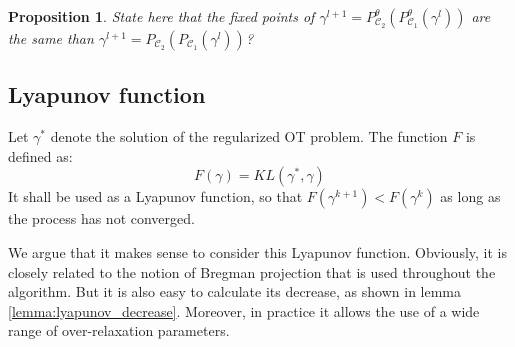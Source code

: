 \documentclass{article} %
\DeclareMathOperator{\Ccal}{\mathcal{C}}
\theoremstyle{plain}
\newtheorem{proposition}{Proposition}
\theoremstyle{definition}
\theoremstyle{remark}
\begin{document}
{\color{blue} \begin{proposition} 
State here that the fixed points of   $\gamma^{l+1} =P^\theta_{\Ccal_2}(P^\theta_{\Ccal_1}(\gamma^l))$ are the same than $\gamma^{l+1} =P_{\Ccal_2}(P_{\Ccal_1}(\gamma^l))$?
\end{proposition}}
\subsection{Lyapunov function}
Let $\gamma^*$ denote the solution of the regularized OT problem.
The function $F$ is defined as:
\begin{equation}\label{eq:lyapunov_function}
F(\gamma) = KL(\gamma^*, \gamma)
\end{equation}
It shall be used as a Lyapunov function, so that $F(\gamma^{k+1}) < F(\gamma^k)$ as long as the process has not converged.

We argue that it makes sense to consider this Lyapunov function.
Obviously, it is closely related to the notion of Bregman projection that is used throughout the algorithm.
But it is also easy to calculate its decrease, as shown in lemma \ref{lemma:lyapunov_decrease}.
Moreover, in practice it allows the use of a wide range of over-relaxation parameters.
\end{document}
